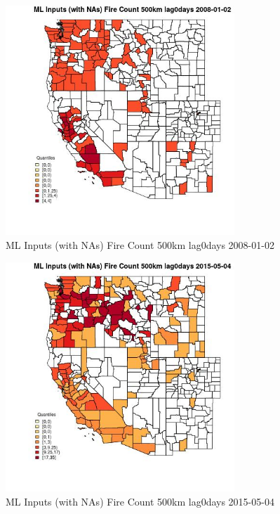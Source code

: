\begin{figure} 
\centering  
\includegraphics[width=0.77\textwidth]{Code_Outputs/Report_ML_input_PM25_Step4_part_e_de_duplicated_aves_compiled_2019-05-18wNAs_CountyFire_Count_500km_lag0daysMean2008-01-02_2008-01-02.jpg} 
\caption{\label{fig:Report_ML_input_PM25_Step4_part_e_de_duplicated_aves_compiled_2019-05-18wNAsCountyFire_Count_500km_lag0daysMean2008-01-02_2008-01-02}ML Inputs (with NAs) Fire Count 500km lag0days 2008-01-02} 
\end{figure} 
 

\begin{figure} 
\centering  
\includegraphics[width=0.77\textwidth]{Code_Outputs/Report_ML_input_PM25_Step4_part_e_de_duplicated_aves_compiled_2019-05-18wNAs_CountyFire_Count_500km_lag0daysMean2015-05-04_2015-05-04.jpg} 
\caption{\label{fig:Report_ML_input_PM25_Step4_part_e_de_duplicated_aves_compiled_2019-05-18wNAsCountyFire_Count_500km_lag0daysMean2015-05-04_2015-05-04}ML Inputs (with NAs) Fire Count 500km lag0days 2015-05-04} 
\end{figure} 
 

